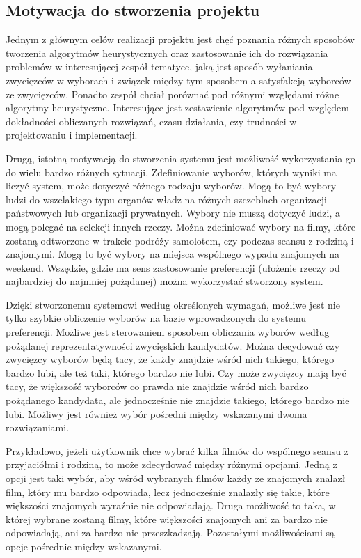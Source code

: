 \documentclass[polish,11pt]{aghthesis}
\begin{document}
\subsection{Motywacja do stworzenia projektu}
Jednym z głównym celów realizacji projektu jest chęć poznania różnych sposobów tworzenia
algorytmów heurystycznych oraz zastosowanie ich do rozwiązania problemów w
interesującej zespół tematyce, jaką jest sposób wyłaniania zwycięzców w wyborach i
związek między tym sposobem a satysfakcją wyborców ze zwycięzców. Ponadto zespół
chciał porównać pod różnymi względami różne algorytmy heurystyczne. Interesujące jest
zestawienie algorytmów pod względem dokładności obliczanych rozwiązań, czasu działania,
czy trudności w projektowaniu i implementacji. 

Drugą, istotną motywacją do stworzenia systemu jest możliwość wykorzystania go do wielu
bardzo różnych sytuacji. Zdefiniowanie wyborów, których wyniki ma liczyć system, może
dotyczyć różnego rodzaju wyborów. Mogą to być wybory ludzi do wszelakiego typu organów
władz na różnych szczeblach organizacji państwowych lub organizacji prywatnych. Wybory
nie muszą dotyczyć ludzi, a mogą polegać na selekcji innych rzeczy. Można zdefiniować
wybory na filmy, które zostaną odtworzone w trakcie podróży samolotem, czy podczas
seansu z rodziną i znajomymi. Mogą to być wybory na miejsca wspólnego wypadu znajomych na weekend. Wszędzie, gdzie ma sens zastosowanie preferencji (ułożenie
rzeczy od najbardziej do najmniej pożądanej) można wykorzystać stworzony system.

Dzięki stworzonemu systemowi według określonych wymagań, możliwe jest nie tylko
szybkie obliczenie wyborów na bazie wprowadzonych do systemu preferencji. Możliwe jest
sterowaniem sposobem obliczania wyborów według pożądanej reprezentatywności
zwycięskich kandydatów. Można decydować czy zwycięzcy wyborów będą tacy, że każdy
znajdzie wśród nich takiego, którego bardzo lubi, ale też taki, którego bardzo nie lubi. Czy
może zwycięzcy mają być tacy, że większość wyborców co prawda nie znajdzie wśród nich
bardzo pożądanego kandydata, ale jednocześnie nie znajdzie takiego, którego bardzo nie
lubi. Możliwy jest również wybór pośredni między wskazanymi dwoma rozwiązaniami.

Przykładowo, jeżeli użytkownik chce wybrać kilka filmów do wspólnego seansu z
przyjaciółmi i rodziną, to może zdecydować między różnymi opcjami. Jedną z opcji jest taki
wybór, aby wśród wybranych filmów każdy ze znajomych znalazł film, który mu bardzo
odpowiada, lecz jednocześnie znalazły się takie, które większości znajomych wyraźnie nie
odpowiadają. Druga możliwość to taka, w której wybrane zostaną filmy, które większości
znajomych ani za bardzo nie odpowiadają, ani za bardzo nie przeszkadzają. Pozostałymi
możliwościami są opcje pośrednie między wskazanymi.
\clearpage
\end{document}
